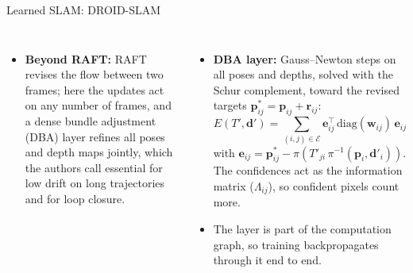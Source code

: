 \begin{frame}{Learned SLAM: DROID-SLAM}
\begin{columns}[T,onlytextwidth]
\begin{itemize}
        \item \textbf{Beyond RAFT:} RAFT revises the flow between two frames; here the updates act on any number of frames, and a dense bundle adjustment (DBA) layer refines all poses and depth maps jointly, which the authors call essential for low drift on long trajectories and for loop closure.
      \end{itemize}
      \begin{itemize}\scriptsize\itemsep0.25em
        \item \textbf{DBA layer:} Gauss--Newton steps on all poses and depths, solved with the Schur complement, toward the revised targets $\mathbf{p}^*_{ij}=\mathbf{p}_{ij}+\mathbf{r}_{ij}$:
        \[ E(T',\mathbf{d}')=\sum_{(i,j)\in\mathcal{E}}\mathbf{e}_{ij}^\top\,\mathrm{diag}(\mathbf{w}_{ij})\,\mathbf{e}_{ij} \]
        with $\mathbf{e}_{ij}=\mathbf{p}^*_{ij}-\pi(T'_{ji}\,\pi^{-1}(\mathbf{p}_i,\mathbf{d}'_i))$. The confidences act as the information matrix ($\Lambda_{ij}$), so confident pixels count more.
        \item The layer is part of the computation graph, so training backpropagates through it end to end.
      \end{itemize}
  \end{columns}
\end{frame}


